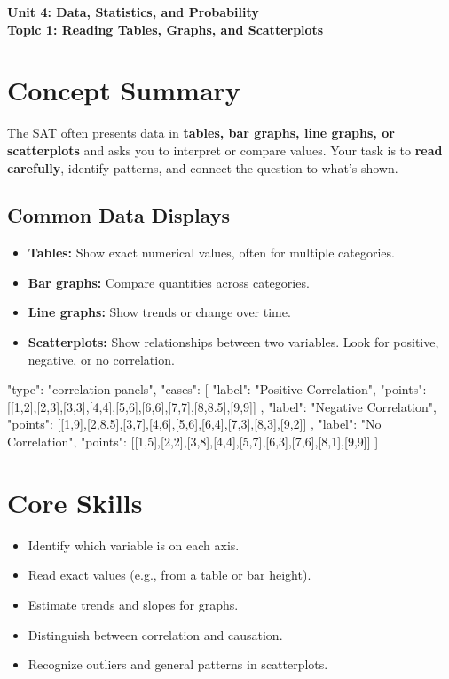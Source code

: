 \documentclass[14pt]{extarticle}
\begin{document}
\raggedright
{}

\begin{center}
    \LARGE \textbf{Unit 4: Data, Statistics, and Probability} \\[6pt]
    \Large \textbf{Topic 1: Reading Tables, Graphs, and Scatterplots}
\end{center}

\vspace{1em}

\section*{Concept Summary}

The SAT often presents data in \textbf{tables, bar graphs, line graphs, or scatterplots} and asks you to interpret or compare values.  
Your task is to \textbf{read carefully}, identify patterns, and connect the question to what’s shown.

\subsection*{Common Data Displays}
\begin{itemize}
  \item \textbf{Tables:} Show exact numerical values, often for multiple categories.
  \item \textbf{Bar graphs:} Compare quantities across categories.
  \item \textbf{Line graphs:} Show trends or change over time.
  \item \textbf{Scatterplots:} Show relationships between two variables. Look for positive, negative, or no correlation.
\end{itemize}

\begin{diagramdata}
{
  "type": "correlation-panels",
  "cases": [
    {
      "label": "Positive Correlation",
      "points": [[1,2],[2,3],[3,3],[4,4],[5,6],[6,6],[7,7],[8,8.5],[9,9]]
    },
    {
      "label": "Negative Correlation",
      "points": [[1,9],[2,8.5],[3,7],[4,6],[5,6],[6,4],[7,3],[8,3],[9,2]]
    },
    {
      "label": "No Correlation",
      "points": [[1,5],[2,2],[3,8],[4,4],[5,7],[6,3],[7,6],[8,1],[9,9]]
    }
  ]
}
\end{diagramdata}

\section*{Core Skills}
\begin{itemize}
  \item Identify which variable is on each axis.
  \item Read exact values (e.g., from a table or bar height).
  \item Estimate trends and slopes for graphs.
  \item Distinguish between correlation and causation.
  \item Recognize outliers and general patterns in scatterplots.
\end{itemize}
\end{document}
